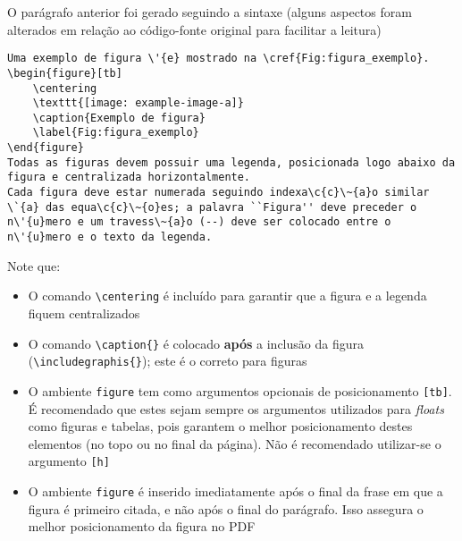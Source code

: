 O parágrafo anterior foi gerado seguindo a sintaxe (alguns aspectos foram alterados em relação ao código-fonte original para facilitar a leitura)
\begin{lstlisting}[breaklines=true]
Uma exemplo de figura \'{e} mostrado na \cref{Fig:figura_exemplo}.
\begin{figure}[tb]
    \centering
    \texttt{[image: example-image-a]}
    \caption{Exemplo de figura}
    \label{Fig:figura_exemplo}
\end{figure}
Todas as figuras devem possuir uma legenda, posicionada logo abaixo da figura e centralizada horizontalmente. 
Cada figura deve estar numerada seguindo indexa\c{c}\~{a}o similar \`{a} das equa\c{c}\~{o}es; a palavra ``Figura'' deve preceder o n\'{u}mero e um travess\~{a}o (--) deve ser colocado entre o n\'{u}mero e o texto da legenda.
\end{lstlisting}
Note que:
\begin{itemize}
    \item O comando \lstinline!\centering! é incluído para garantir que a figura e a legenda fiquem centralizados
    \item O comando \lstinline!\caption{}! é colocado \textbf{após} a inclusão da figura (\lstinline!\includegraphis{}!); este é o correto para figuras
    \item O ambiente \lstinline!figure! tem como argumentos opcionais de posicionamento \lstinline![tb]!. É recomendado que estes sejam sempre os argumentos utilizados para \textit{floats} como figuras e tabelas, pois garantem o melhor posicionamento destes elementos (no topo ou no final da página). Não é recomendado utilizar-se o argumento \lstinline![h]!
    \item O ambiente \lstinline!figure! é inserido imediatamente após o final da frase em que a figura é primeiro citada, e não após o final do parágrafo. Isso assegura o melhor posicionamento da figura no PDF
\end{itemize}

